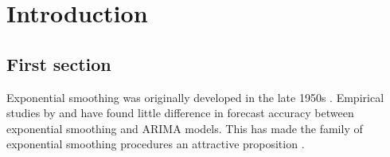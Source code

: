 
\chapter{Introduction}

\section{First section}

Exponential smoothing was originally developed in the late
1950s \citep{Brown59,Brown63,Holt57,Winters60}. Empirical
studies by \citet[2000]{MH79} and \citet{Metal82} have found
little difference in forecast accuracy between exponential
smoothing and ARIMA models. This has made the family of
exponential smoothing procedures an attractive proposition
\citep[see][]{CKOS01}.

